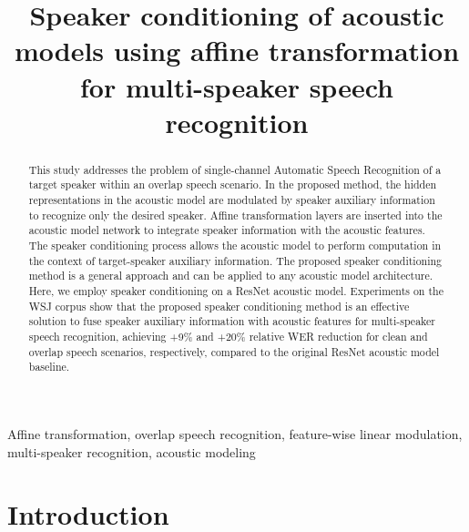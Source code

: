 \documentclass{article}
\title{Speaker conditioning of acoustic models using affine transformation for multi-speaker speech recognition}
\begin{document}
%
\maketitle
%
\begin{abstract}

This study addresses the problem of single-channel Automatic Speech Recognition of a target speaker within an overlap speech scenario. In the proposed method, the hidden representations in the acoustic model are modulated by speaker auxiliary  information to recognize only the desired speaker. Affine transformation layers are inserted into the acoustic model network to integrate speaker information with the acoustic features. The speaker conditioning process allows the acoustic model to perform computation in the context of target-speaker auxiliary information. The proposed speaker conditioning method is a general approach and can be applied to any acoustic model architecture. Here, we employ speaker conditioning on a ResNet acoustic model. Experiments on the WSJ corpus show that the proposed speaker conditioning method is an effective solution to fuse speaker auxiliary information with acoustic features for multi-speaker speech recognition, achieving +9\% and +20\% relative WER reduction for clean and overlap speech scenarios, respectively, compared to the original ResNet acoustic model baseline. 

\end{abstract}
%
\begin{keywords}
 Affine transformation, overlap speech recognition, feature-wise linear modulation, multi-speaker recognition, acoustic modeling
\end{keywords}
%
\section{Introduction}
\label{sec:intro}

\end{document}
